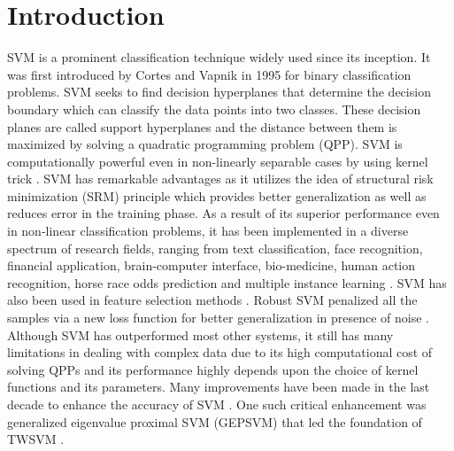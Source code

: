 \documentclass[pdflatex,sn-mathphys]{sn-jnl}%
\theoremstyle{thmstyleone}%
\theoremstyle{thmstyletwo}%
\theoremstyle{thmstylethree}%
\begin{document}
\section{Introduction}
\label{intro}
SVM \cite{cortes1995support} is a prominent classification technique widely used since its inception. It was first introduced by Cortes and Vapnik \cite{cortes1995support} in 1995 for binary classification problems. SVM seeks to find decision hyperplanes that determine the decision boundary which can classify the data points into two classes. These decision planes are called support hyperplanes and the distance between them is maximized by solving a quadratic programming problem (QPP). SVM is computationally powerful even in non-linearly separable cases by using kernel trick \cite{cristianini2000introduction}. SVM has remarkable advantages as it utilizes the idea of structural risk minimization (SRM) principle which provides better generalization as well as reduces error in the training phase. As a result of its superior performance even in non-linear classification problems, it has been implemented in a diverse spectrum of research fields, ranging from text classification, face recognition, financial application, brain-computer interface, bio-medicine, human action recognition, horse race odds prediction and multiple instance learning \cite{tong2001support,agarwal2014prediction,scholkopf2004support, tay2001application,gupta2019financial, noble2004support, osuna1997training, hua2001support, byvatov2003support, morra2010comparison, tanveerasparse, vapnik2013nature, edelman2007adapting,poursaeidi2014robust}. SVM has also been used in feature selection methods \cite{le2017dca}. Robust SVM penalized all the samples via a new loss function for better generalization in presence of noise \cite{wang2010adjusted}. Although SVM has outperformed most other systems, it still has many limitations in dealing with complex data due to its high computational cost of solving QPPs and its performance highly depends upon the choice of kernel functions and its parameters. Many improvements have been made in the last decade to enhance the accuracy of SVM \cite{li2020generalized, li2019single}. One such critical enhancement was generalized eigenvalue proximal SVM (GEPSVM) \cite{mangasarian2001proximal,khemchandani2017generalized,shao2013improved} that led the foundation of TWSVM \cite{khemchandani2007twin,TWSVMbook}. 
\end{document}

